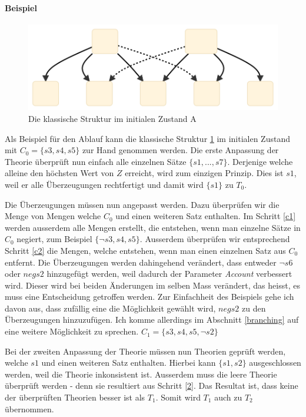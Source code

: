 \documentclass{article}
\begin{document}
\paragraph{Beispiel}
\begin{figure}[h]
  \centering
  \includegraphics[width=\textwidth]{classical_initial1}
  \caption{Die klassische Struktur im initialen Zustand A\label{fig:classset-initial1}}
\end{figure}

 Als Beispiel für den Ablauf kann die klassische Struktur \ref{fig:classset-initial1} im initialen Zustand mit $C_0 = \{s3, s4, s5\}$ zur Hand genommen werden. Die erste Anpassung der Theorie überprüft nun einfach alle einzelnen Sätze $\{s1,...,s7\}$. Derjenige welche alleine den höchsten Wert von $Z$ erreicht, wird zum einzigen Prinzip. Dies ist $s1$, weil er alle Überzeugungen rechtfertigt und damit wird $\{s1\}$ zu $T_0$.
 
 Die Überzeugungen müssen nun angepasst werden. Dazu überprüfen wir die Menge von Mengen welche $C_0$ und einen weiteren Satz enthalten. Im Schritt \ref{c1} werden ausserdem alle Mengen erstellt, die entstehen, wenn man einzelne Sätze in $C_0$ negiert, zum Beispiel $\{\lnot s3, s4, s5\}$. Ausserdem überprüfen wir entsprechend Schritt \ref{c2} die Mengen, welche entstehen, wenn man einen einzelnen Satz aus $C_0$ entfernt. Die Überzeugungen werden dahingehend verändert, dass entweder $\neg s6$ oder $neg s2$ hinzugefügt werden, weil dadurch der Parameter \textit{Account} verbessert wird. Dieser wird bei beiden Änderungen im selben Mass verändert, das heisst, es muss eine Entscheidung getroffen werden. Zur Einfachheit des Beispiels gehe ich davon aus, dass zufällig eine die Möglichkeit gewählt wird, $neg s2$ zu den Überzeugungen hinzuzufügen. Ich komme allerdings im Abschnitt \ref{branching} auf eine weitere Möglichkeit zu sprechen. $C_1 = \{s3, s4, s5, \neg s2\}$
 
 Bei der zweiten Anpassung der Theorie müssen nun Theorien geprüft werden, welche $s1$ und einen weiteren Satz enthalten. Hierbei kann $\{s1,s2\}$ ausgeschlossen werden, weil die Theorie inkonsistent ist. Ausserdem muss die leere Theorie überprüft werden - denn sie resultiert aus Schritt \ref{2}. Das Resultat ist, dass keine der überprüften Theorien besser ist als $T_1$. Somit wird $T_1$ auch zu $T_2$ übernommen.
 
\end{document}
